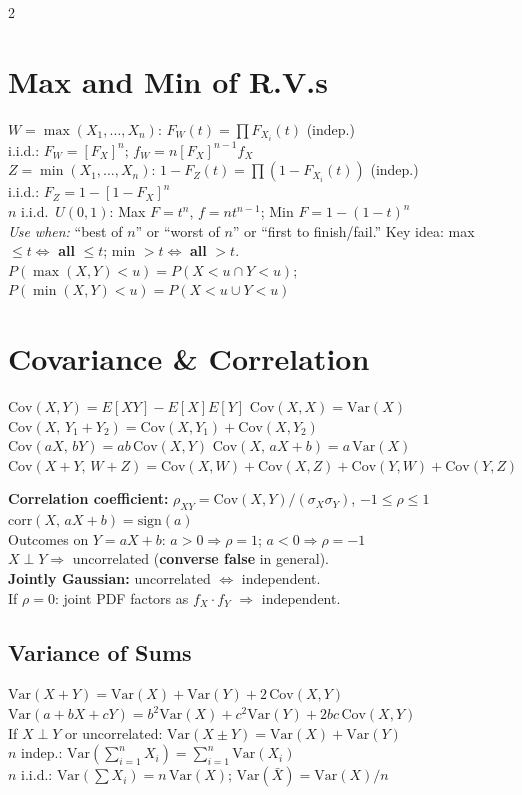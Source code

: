 \documentclass[10pt]{article}
\begin{document}
\begin{multicols*}{2}
\section{Max and Min of R.V.s}
$W = \max(X_1,\ldots,X_n)$: $F_W(t) = \prod F_{X_i}(t)$ (indep.) \\
i.i.d.: $F_W = [F_X]^n$;\; $f_W = n[F_X]^{n-1} f_X$ \\
$Z = \min(X_1,\ldots,X_n)$: $1\!-\!F_Z(t) = \prod(1\!-\!F_{X_i}(t))$ (indep.) \\
i.i.d.: $F_Z = 1 - [1\!-\!F_X]^n$ \\
$n$ i.i.d.\ $U(0,1)$: Max $F\!=\!t^n$, $f\!=\!nt^{n-1}$;\; Min $F\!=\!1\!-\!(1\!-\!t)^n$ \\
\textit{Use when:} ``best of $n$'' or ``worst of $n$'' or ``first to finish/fail.'' Key idea: max $\le t \iff$ \textbf{all} $\le t$; min $> t \iff$ \textbf{all} $> t$. \\
$P(\max(X,Y) < u) = P(X\!<\!u \cap Y\!<\!u)$;\; $P(\min(X,Y) < u) = P(X\!<\!u \cup Y\!<\!u)$

\section{Covariance \& Correlation}
$\text{Cov}(X,Y) = E[XY] - E[X]E[Y]$ \quad $\text{Cov}(X,X) = \text{Var}(X)$ \\
$\text{Cov}(X,\, Y_1\!+\!Y_2) = \text{Cov}(X,Y_1) + \text{Cov}(X,Y_2)$ \\
$\text{Cov}(aX,\, bY) = ab\,\text{Cov}(X,Y)$ \;\; $\text{Cov}(X,\, aX\!+\!b) = a\,\text{Var}(X)$ \\
$\text{Cov}(X\!+\!Y,\, W\!+\!Z) = \text{Cov}(X,W) + \text{Cov}(X,Z) + \text{Cov}(Y,W) + \text{Cov}(Y,Z)$

\textbf{Correlation coefficient:} $\rho_{XY} = \text{Cov}(X,Y)/(\sigma_X \sigma_Y)$, $-1 \le \rho \le 1$ \\
$\text{corr}(X,\, aX+b) = \text{sign}(a)$ \\
Outcomes on $Y\!=\!aX\!+\!b$: $a>0 \Rightarrow \rho=1$;\; $a<0 \Rightarrow \rho=-1$ \\
$X \perp Y \Rightarrow$ uncorrelated (\textbf{converse false} in general). \\
\textbf{Jointly Gaussian:} uncorrelated $\iff$ independent. \\
If $\rho=0$: joint PDF factors as $f_X \cdot f_Y$ $\Rightarrow$ independent.

\subsection{Variance of Sums}
$\text{Var}(X + Y) = \text{Var}(X) + \text{Var}(Y) + 2\,\text{Cov}(X,Y)$ \\
$\text{Var}(a + bX + cY) = b^2\text{Var}(X) + c^2\text{Var}(Y) + 2bc\,\text{Cov}(X,Y)$ \\
If $X \perp Y$ or uncorrelated: $\text{Var}(X \pm Y) = \text{Var}(X) + \text{Var}(Y)$ \\
$n$ indep.: $\text{Var}(\sum_{i=1}^n X_i) = \sum_{i=1}^n \text{Var}(X_i)$ \\
$n$ i.i.d.: $\text{Var}(\sum X_i) = n\,\text{Var}(X)$;\; $\text{Var}(\bar{X}) = \text{Var}(X)/n$


\end{multicols*}
\end{document}
